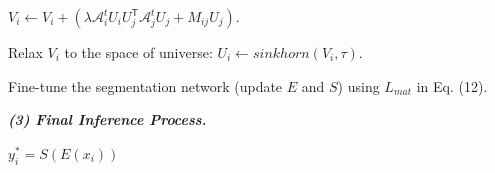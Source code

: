 \begin{algorithm*}
\begin{algorithmic}[1]
        \REPEAT

        \STATE $V_i \leftarrow V_i + (\lambda \mathcal{A}_i^t U_i U_j^{\mathsf{T}} \mathcal{A}_j^t U_j + M_{ij} U_j)$.

        \STATE Relax $V_i$ to the space of universe: $U_i \leftarrow sinkhorn(V_i, \tau)$. 


        \ENDFOR
        
    \STATE Fine-tune the segmentation network (update $E$ and $S$) using $L_{mat}$ in Eq. (12).


    \textit{\textbf{(3) Final Inference Process.}}
    
    \STATE  $y^{*}_i = S(E(x_i))$

    \end{algorithmic}
    \label{algo:test}
\end{algorithm*}



%     
%     
    

